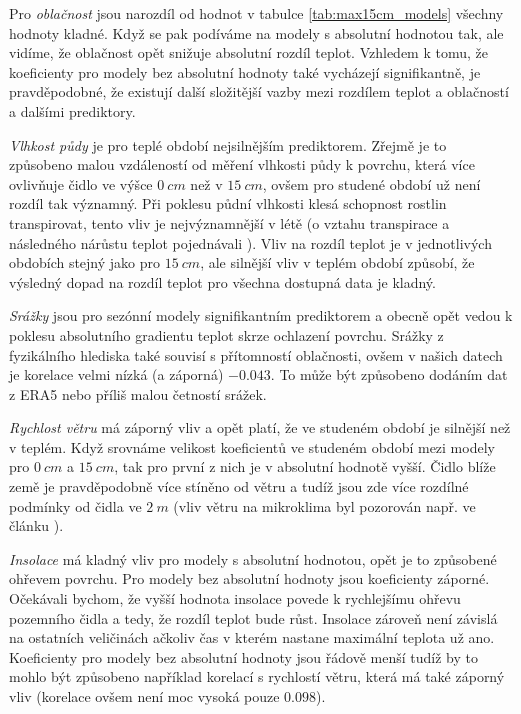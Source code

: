 Pro \textit{oblačnost} jsou narozdíl od hodnot v tabulce \ref{tab:max15cm_models} všechny hodnoty kladné. Když se pak podíváme na modely s absolutní hodnotou tak, ale vidíme, že oblačnost opět snižuje absolutní rozdíl teplot. Vzhledem k tomu, že koeficienty pro modely bez absolutní hodnoty také vycházejí signifikantně, je pravděpodobné, že existují další složitější vazby mezi rozdílem teplot a oblačností a dalšími prediktory.

\textit{Vlhkost půdy} je pro teplé období nejsilnějším prediktorem. Zřejmě je to způsobeno malou vzdáleností od měření vlhkosti půdy k povrchu, která více ovlivňuje čidlo ve výšce $\SI{0}{cm}$ než v $\SI{15}{cm}$, ovšem pro studené období už není rozdíl tak významný. Při poklesu půdní vlhkosti klesá schopnost rostlin transpirovat, tento vliv je nejvýznamnější v létě (o vztahu transpirace a následného nárůstu teplot pojednávali \parencite{snow_deFrenneForestMicroclimates}). Vliv na rozdíl teplot je v jednotlivých obdobích stejný jako pro $\SI{15}{cm}$, ale silnější vliv v teplém období způsobí, že výsledný dopad na rozdíl teplot pro všechna dostupná data je kladný.

\textit{Srážky} jsou pro sezónní modely signifikantním prediktorem a obecně opět vedou k poklesu absolutního gradientu teplot skrze ochlazení povrchu. Srážky z fyzikálního hlediska také souvisí s přítomností oblačnosti, ovšem v našich datech je korelace velmi nízká (a záporná) $-0.043$. To může být způsobeno dodáním dat z ERA5 nebo příliš malou četností srážek.

\textit{Rychlost větru} má záporný vliv a opět platí, že ve studeném období je silnější než v teplém. Když srovnáme velikost koeficientů ve studeném období mezi modely pro $\SI{0}{cm}$ a $\SI{15}{cm}$, tak pro první z nich je v absolutní hodnotě vyšší. Čidlo blíže země je pravděpodobně více stíněno od větru a tudíž jsou zde více rozdílné podmínky od čidla ve $\SI{2}{m}$ (vliv větru na mikroklima byl pozorován např. ve článku \parencite{wind_contrastingmicroclimates}). 

\textit{Insolace} má kladný vliv pro modely s absolutní hodnotou, opět je to způsobené ohřevem povrchu. Pro modely bez absolutní hodnoty jsou koeficienty záporné. Očekávali bychom, že vyšší hodnota insolace povede k rychlejšímu ohřevu pozemního čidla a tedy, že rozdíl teplot bude růst. Insolace zároveň není závislá na ostatních veličinách ačkoliv čas v kterém nastane maximální teplota už ano. Koeficienty pro modely bez absolutní hodnoty jsou řádově menší tudíž by to mohlo být způsobeno například korelací s rychlostí větru, která má také záporný vliv (korelace ovšem není moc vysoká pouze $0.098$).

